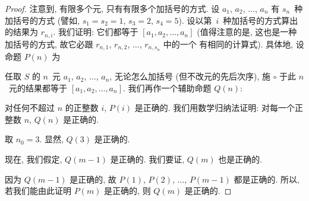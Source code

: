 \documentclass[%
    UTF8,%
    fontset=none,%
    punct=kaiming,%
    zihao=-4,%
    a4paper,%
    oneside,%
]{ctexbook}
\makeatletter
\renewenvironment{quotation}
{\list{}{\listparindent 2\ccwd%
\itemindent\listparindent
\leftmargin\rightmargin
\parsep\z@ \@plus\p@}%
\item\relax}
{\endlist}
\makeatother
\begin{document}
\begin{proof}
    注意到, 有限多个元, 只有有限多个加括号的方式.
    设 \(a_1\), \(a_2\), \(\dots\), \(a_n\)
    有 \(s_n\)~种加括号的方式
    (譬如, \(s_1 = s_2 = 1\),
    \(s_3 = 2\), \(s_4 = 5\)).
    设以第~\(i\)~种加括号的方式算出的结果为 \(r_{n,i}\).
    我们证明:
    它们都等于
    \([a_1, a_2, \dots, a_n]\)
    (值得注意的是, 这也是一种加括号的方式,
    故它必跟 \(r_{n,1}\), \(r_{n,2}\), \(\dots\),
    \(r_{n,s_n}\) 中的一个%
    有相同的计算式).
    具体地, 设命题 \(P(n)\) 为
    \begin{quotation}
        任取 \(S\) 的 \(n\)~元
        \(a_1\), \(a_2\), \(\dots\), \(a_n\),
        无论怎么加括号
        (但不改元的先后次序),
        施 \(\circ\) 于此 \(n\)~元的结果都等于
        \([a_1, a_2, \dots, a_n]\).
    \end{quotation}
    我们再作一个辅助命题 \(Q(n)\):
    \begin{quotation}
        对任何不超过 \(n\) 的正整数 \(i\),
        \(P(i)\) 是正确的.
    \end{quotation}
    我们用数学归纳法证明:
    对每一个正整数 \(n\), \(Q(n)\) 是正确的.

    取 \(n_0 = 3\).
    显然, \(Q(3)\) 是正确的.

    现在, 我们假定, \(Q(m-1)\) 是正确的.
    我们要证, \(Q(m)\) 也是正确的.

    因为 \(Q(m-1)\) 是正确的,
    故 \(P(1)\), \(P(2)\), \(\dots\), \(P(m-1)\) 都是正确的.
    所以, 若我们能由此证明 \(P(m)\) 是正确的,
    则 \(Q(m)\) 是正确的.


\end{proof}
\end{document}
